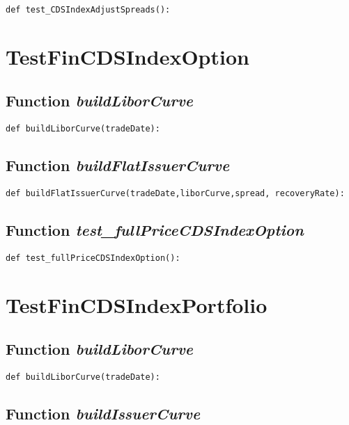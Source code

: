 \documentclass[twoside,11pt]{book}
\begin{document}
\begin{lstlisting}
def test_CDSIndexAdjustSpreads():
\end{lstlisting}


\newpage
\section{TestFinCDSIndexOption}

\subsection{Function {\it buildLiborCurve}}


\begin{lstlisting}
def buildLiborCurve(tradeDate):
\end{lstlisting}

\subsection{Function {\it buildFlatIssuerCurve}}


\begin{lstlisting}
def buildFlatIssuerCurve(tradeDate,liborCurve,spread, recoveryRate):
\end{lstlisting}

\subsection{Function {\it test\_fullPriceCDSIndexOption}}


\begin{lstlisting}
def test_fullPriceCDSIndexOption():
\end{lstlisting}


\newpage
\section{TestFinCDSIndexPortfolio}

\subsection{Function {\it buildLiborCurve}}


\begin{lstlisting}
def buildLiborCurve(tradeDate):
\end{lstlisting}

\subsection{Function {\it buildIssuerCurve}}
\end{document}
